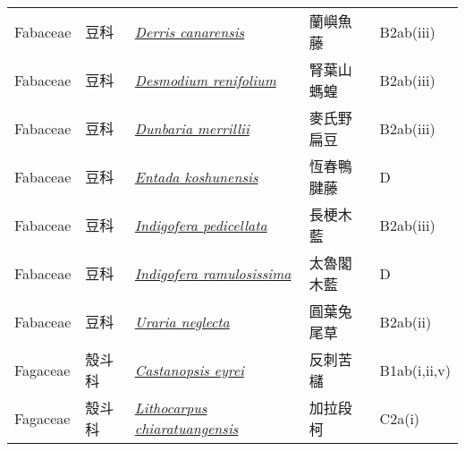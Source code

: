 {\begin{longtable}{L{2.5cm}L{2cm}L{5cm}L{2.5cm}L{3cm}}
    Fabaceae & 豆科 & \href{http://www.theplantlist.org/tpl1.1/search?q=Derris+canarensis}{\textit{Derris canarensis} } & 蘭嶼魚藤 & B2ab(iii)    \\
    Fabaceae & 豆科 & \href{http://www.theplantlist.org/tpl1.1/search?q=Desmodium+renifolium}{\textit{Desmodium renifolium} } & 腎葉山螞蝗 & B2ab(iii)    \\
    Fabaceae & 豆科 & \href{http://www.theplantlist.org/tpl1.1/search?q=Dunbaria+merrillii}{\textit{Dunbaria merrillii} } & 麥氏野扁豆 & B2ab(iii)    \\
    Fabaceae & 豆科 & \href{http://www.theplantlist.org/tpl1.1/search?q=Entada+koshunensis}{\textit{Entada koshunensis} } & 恆春鴨腱藤 & D    \\
    Fabaceae & 豆科 & \href{http://www.theplantlist.org/tpl1.1/search?q=Indigofera+pedicellata}{\textit{Indigofera pedicellata} } & 長梗木藍 & B2ab(iii)    \\
    Fabaceae & 豆科 & \href{http://www.theplantlist.org/tpl1.1/search?q=Indigofera+ramulosissima}{\textit{Indigofera ramulosissima} } & 太魯閣木藍 & D    \\
    Fabaceae & 豆科 & \href{http://www.theplantlist.org/tpl1.1/search?q=Uraria+neglecta}{\textit{Uraria neglecta} } & 圓葉兔尾草 & B2ab(ii)    \\
    Fagaceae & 殼斗科 & \href{http://www.theplantlist.org/tpl1.1/search?q=Castanopsis+eyrei}{\textit{Castanopsis eyrei} } & 反刺苦櫧 & B1ab(i,ii,v)    \\
    Fagaceae & 殼斗科 & \href{http://www.theplantlist.org/tpl1.1/search?q=Lithocarpus+chiaratuangensis}{\textit{Lithocarpus chiaratuangensis} } & 加拉段柯 & C2a(i)    \\

\end{longtable}}
